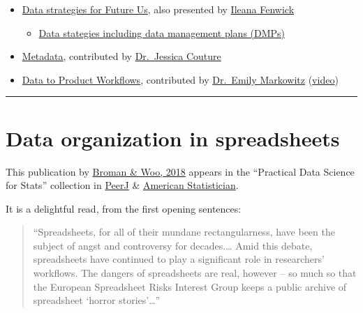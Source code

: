 \documentclass[
  letterpaper,
  DIV=11,
  numbers=noendperiod]{scrreprt}
\providecommand{\tightlist}{%
  \setlength{\itemsep}{0pt}\setlength{\parskip}{0pt}}
\begin{document}
\begin{itemize}
\tightlist
\item
  \href{https://docs.google.com/presentation/d/1rv-JfJeuYhogxV6Dpn_hNDm09nfKnOMtmZpgcciI_98/edit?usp=sharing}{Data
  strategies for Future Us}, also presented by
  \href{https://twitter.com/_ileanaf}{Ileana Fenwick}

  \begin{itemize}
  \tightlist
  \item
    \href{https://docs.google.com/presentation/d/145TOlLGH3qbJzPWdEJ2KS1LFdvP3MLTWgORHktb2R1k/edit\#slide=id.p}{Data
    stategies including data management plans (DMPs)}
  \end{itemize}
\item
  \href{https://docs.google.com/presentation/d/10X5i9zZ0uVeEaTW6F2aSvkrcxLCgW0JU9rVZvPB1ZKc/edit\#slide=id.g6532ff24f4_0_0}{Metadata},
  contributed by \href{https://www.jessicalcouture.com/}{Dr.~Jessica
  Couture}
\item
  \href{https://docs.google.com/presentation/d/12Jru3DReVH3sO-nG0msAjCNS8PVNuaYSxHi-Bxlkr1E/edit?usp=sharing}{Data
  to Product Workflows}, contributed by
  \href{https://twitter.com/emilyhmarkowitz}{Dr.~Emily Markowitz}
  (\href{https://www.youtube.com/watch?v=CyqOjQwQLy8}{video})
\end{itemize}

\begin{center}\rule{0.5\linewidth}{0.5pt}\end{center}

\hypertarget{data-organization-in-spreadsheets}{%
\section{Data organization in
spreadsheets}\label{data-organization-in-spreadsheets}}

This publication by \href{https://peerj.com/preprints/3183/}{Broman \&
Woo, 2018} appears in the ``Practical Data Science for Stats''
collection in
\href{https://peerj.com/collections/50-practicaldatascistats/}{PeerJ} \&
\href{https://www.tandfonline.com/toc/utas20/72/1}{American
Statistician}.

It is a delightful read, from the first opening sentences:

\begin{quote}
``Spreadsheets, for all of their mundane rectangularness, have been the
subject of angst and controversy for decades.\ldots{} Amid this debate,
spreadsheets have continued to play a significant role in researchers'
workflows. The dangers of spreadsheets are real, however -- so much so
that the European Spreadsheet Risks Interest Group keeps a public
archive of spreadsheet `horror stories'\ldots{}''
\end{quote}
\end{document}
